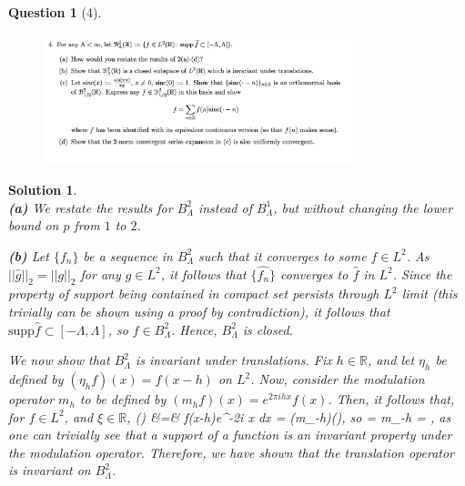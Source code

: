 \documentclass{article} %
\def\eQb#1\eQe{\begin{eqnarray*}#1\end{eqnarray*}}
\theoremstyle{quest}
\newtheorem*{question}{Question}
\newtheorem*{solution}{Solution}
\begin{document}
\newpage 

\begin{question}[4]
\hfill
\begin{figure}[h!]
  \centering
    \includegraphics[width=0.8\textwidth]{HA-5-4.png}
\end{figure}
\end{question}
\begin{solution} \hfill \\
\textbf{(a)} We restate the results for $B^2_{\Lambda}$ instead of $B^1_{\Lambda}$,
but without changing the lower bound on $p$ from $1$ to $2$. 

\bigskip

\textbf{(b)} Let $\{f_n\}$ be a sequence in $B_{\Lambda}^2$ such that it converges to
some $f \in L^2$. As $||\hat{g}||_2 = ||g||_2$ for any $g \in L^2$, it follows that
$\{\hat{f_n}\}$ converges to $\hat{f}$ in $L^2$. Since the property of support being contained
in compact set
persists through $L^2$ limit (this trivially can be shown using a proof by contradiction), 
it follows that $\text{supp}\hat{f} \subset [-\Lambda,\Lambda]$,
so $f \in B_{\Lambda}^2$. Hence, $B_{\Lambda}^2$ is closed. 

\smallskip

We now show that $B_{\Lambda}^2$ is invariant under translations. Fix $h \in \mathbb{R}$, and
let $\eta_{h}$ be defined by $(\eta_{h}f)(x) = f(x-h)$ on $L^2$. Now, consider the modulation
operator $m_{h}$ to be defined by $(m_{h}f)(x) = e^{2\pi ih x}f(x)$. Then, it follows 
that, for $f \in L^2$, and $\xi \in \mathbb{R}$, 
\eQb
\widehat{\eta_{h}f}(\xi) &=& \int f(x-h)e^{-2\pi i \xi x} dx = (m_{-h})(\xi),
\eQe
so 
\eQb
\text{supp}\> \>  = \> \> {m_{-h}} = 
\>\> , 
\eQe
as one can trivially see that a support of a function is an invariant property under 
the modulation operator.
Therefore, we have shown that the translation operator is invariant on $B_{\Lambda}^2$.


\bigskip 


\end{solution}
\end{document}
